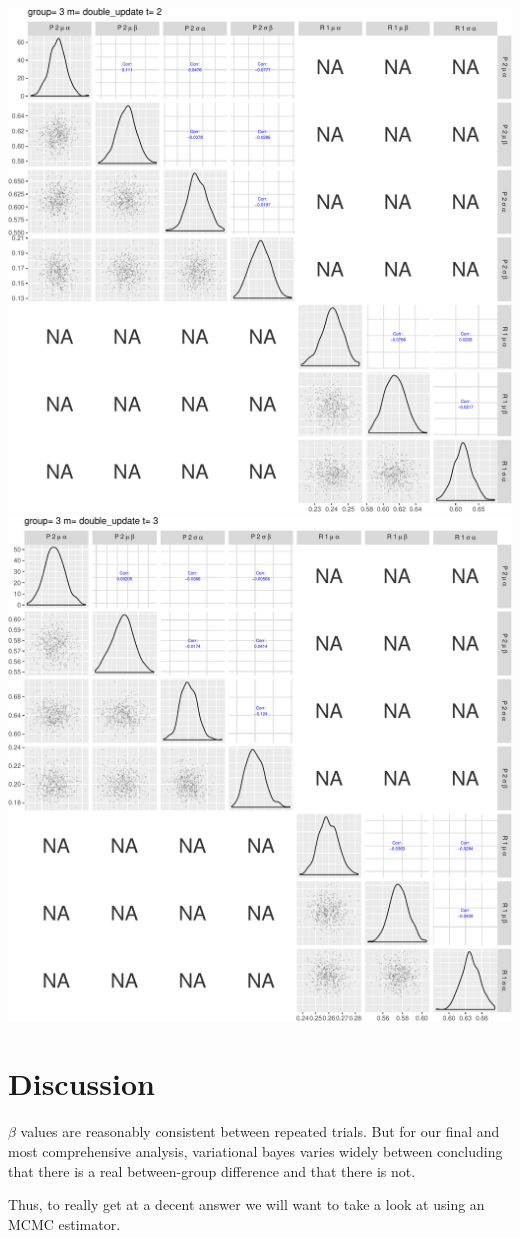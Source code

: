 \documentclass[]{article}
\begin{document}
\includegraphics{compare_models_files/figure-latex/PairsPlots-23.pdf}
\includegraphics{compare_models_files/figure-latex/PairsPlots-24.pdf}

\section{Discussion}\label{discussion}

\(\beta\) values are reasonably consistent between repeated trials. But
for our final and most comprehensive analysis, variational bayes varies
widely between concluding that there is a real between-group difference
and that there is not.

Thus, to really get at a decent answer we will want to take a look at
using an MCMC estimator.
\end{document}
